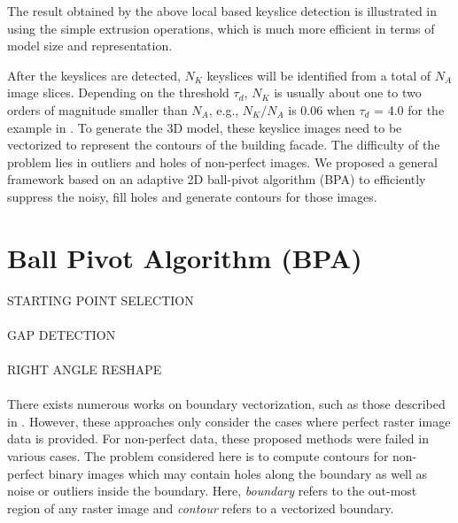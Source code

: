The result obtained by the above local based keyslice detection is illustrated in 
using the simple extrusion operations, which is much more efficient in terms of 
model size and representation.








After the keyslices are detected, $N_K$ keyslices will be identified
from a total of $N_A$ image slices.
Depending on the threshold $\tau_{d}$, $N_K$ is usually about one to two
orders of magnitude smaller than $N_A$, e.g., $N_K/N_A$ is 0.06 when
$\tau_d$ = 4.0 for the example in .
To generate the 3D model, these keyslice images need to be vectorized to
represent the contours of the building facade.
The difficulty of the problem lies in outliers and holes of non-perfect images.
We proposed a general framework based on an adaptive 2D ball-pivot algorithm (BPA) 
 to efficiently suppress the noisy, fill holes and generate contours for those images.

\section{Ball Pivot Algorithm (BPA)}
\label{sec:BPA}

STARTING POINT SELECTION
\\
\\
GAP DETECTION
\\
\\
RIGHT ANGLE RESHAPE
\\
\\


There exists numerous works on boundary vectorization,
such as those described in \cite{DP_RP,DP_LC,DP_AAKMT}.
However, these approaches
only consider the cases where perfect raster image data is provided.
For non-perfect data, these proposed methods were failed in various cases.
The problem considered here is to compute contours
for non-perfect binary images which may contain holes
along the boundary as well as noise or outliers
inside the boundary. Here, {\it boundary} refers to the
out-most region of any raster image and
{\it contour} refers to a vectorized boundary.


